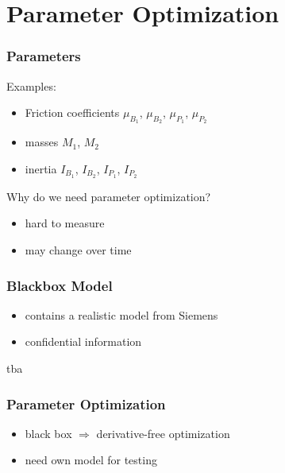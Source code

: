\section{Parameter Optimization}

\begin{frame}[c]
\frametitle{Parameters}
Examples:
\begin{itemize}
	\item{Friction coefficients $\mu_{B_1}$, $\mu_{B_2}$, $\mu_{P_1}$, $\mu_{P_2}$}
	\item{masses $M_1$, $M_2$}
	\item{inertia $I_{B_1}$, $I_{B_2}$, $I_{P_1}$, $I_{P_2}$}
\end{itemize}
\vspace{0.5cm}
Why do we need parameter optimization?
\begin{itemize}
	\item{hard to measure}
	\item{may change over time}
\end{itemize}
\end{frame}

\begin{frame}[c]
\frametitle{Blackbox Model}
\begin{itemize}
	\item{contains a realistic model from Siemens}
	\item{confidential information}
\end{itemize}
\vspace{0.5cm}
tba
\end{frame}

\begin{frame}
\frametitle{Parameter Optimization}
\begin{itemize}
	\item{black box $\Rightarrow$ derivative-free optimization}
	\vspace{0.5cm}
	\item{need own model for testing}
\end{itemize}
\end{frame}

